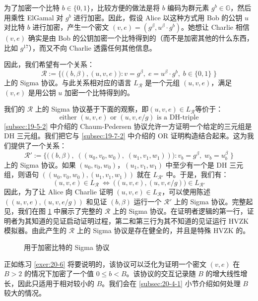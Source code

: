 \begin{example}[加密后的比特]\label{exmp:20-3}
为了加密一个比特 $b\in\{0,1\}$，比较方便的做法是将 $b$ 编码为群元素 $g^b\in\mathbb{G}$，然后用乘性 ElGamal 对 $g^b$ 进行加密。因此，假设 Alice 以这种方式用 Bob 的公钥 $u$ 对比特 $b$ 进行加密，产生一个密文 $(v,e)=(g^\beta,u^\beta\cdot{g^b})$。她想让 Charlie 相信 $(v,e)$ 确实是由 Bob 的公钥加密一个比特得到的（而不是加密其他的什么东西，比如 $g^{17}$），而又不向 Charlie 透露任何其他信息。

因此，我们希望有一个关系：
\[
\mathcal{R}:=
\bigg\lbrace
\Big(
(b,\beta),(u,v,e)
\Big):
v=g^\beta,\;
e=u^\beta\cdot g^b,\;
b\in\{0,1\}\;
\bigg\rbrace
\]
上的 Sigma 协议。与此关系相对应的语言 $L_{\mathcal R}$ 是一个元组 $(u,v,e)$，满足 $(v,e)$ 是用公钥 $u$ 加密一个比特得到的。

我们的 $\mathcal{R}$ 上的 Sigma 协议基于下面的观察，即$(u,v,e)\in L_{\mathcal R}$等价于：
\[
\text{either }
(u,v,e)
\text{ or }
(u,v,{e}/{g})
\text{ is a DH-triple}
\]
\ref{subsec:19-5-2} 中介绍的 Chaum-Pedersen 协议允许一方证明一个给定的三元组是 DH 三元组。我们把它与 \ref{subsec:19-7-2} 中介绍的 OR 证明构造结合起来。这为我们提供了一个关系：
\[
\mathcal{R}':=
\bigg\lbrace
\Big(
(b,\beta),\;((u_0,v_0,w_0),\;(u_1,v_1,w_1))
\Big):
v_b=g^\beta,\;
w_b=u_b^\beta\;
\bigg\rbrace
\]
上的 Sigma 协议。如果 $(u_0,v_0,w_0)$，$(u_1,v_1,w_1)$ 中至少有一个是 DH 三元组，则语句 $((u_0,v_0,w_0),(u_1,v_1,w_1))$ 就在 $L_{\mathcal{R}'}$ 中。于是，我们有：
\[
(u,v,e)\in L_{\mathcal R}\ \iff\ 
\Big((u,v,e),(u,v,{e}/{g})\Big)\in L_{\mathcal R'}
\]
因此，为了让 Alice 向 Charlie 证明 $(u,v,e)\in L_{\mathcal{R}}$，可以使用陈述 $((u,v,e),(u,v,{e}/{g}))$ 和见证 $(b,\beta)$ 运行一个 $\mathcal{R}'$ 上的 Sigma 协议。完整起见，我们在图 \ref{fig:20-1} 中展示了完整的 $\mathcal R$ 上的 Sigma 协议。在证明者逻辑的第一行，证明者为其知道的见证启动证明过程，第二和第三行为其不知道的见证运行 HVZK 模拟器。由此产生的 $\mathcal R$ 上的 Sigma 协议是存在健全的，并且是特殊 HVZK 的。

\begin{figure}
  \centering
  
  \caption{用于加密比特的 Sigma 协议}
  \label{fig:20-1}
\end{figure}

正如练习 \ref{exer:20-6} 将要说明的，该协议可以泛化为证明一个密文 $(v,e)$ 在 $B>2$ 的情况下加密了一个值 $0\leq b < B$。该协议的交互记录随 $B$ 的增大线性增长，因此只适用于相对较小的 $B$。我们会在 \ref{subsec:20-4-1} 小节介绍如何处理 $B$ 较大的情况。
\end{example}

